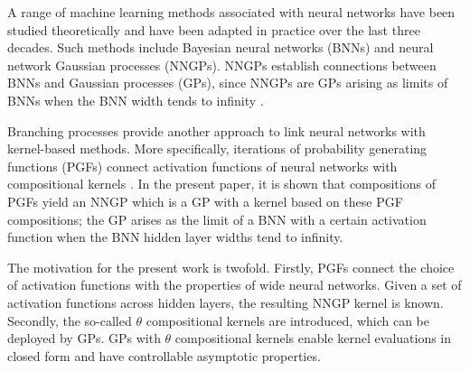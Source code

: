 \documentclass[final, 12pt]{colt2021} %
\begin{document}
A range of machine learning methods
associated with neural networks
have been studied theoretically
and have been adapted in practice
over the last three decades.
Such methods include
Bayesian neural networks (BNNs) and
neural network Gaussian processes (NNGPs).
NNGPs establish connections between
BNNs and Gaussian processes (GPs),
since NNGPs are GPs arising as limits of BNNs
when the BNN width tends to infinity
\citep{neal1996, matthews2018, agrawal2020}.

Branching processes provide another approach
to link neural networks with kernel-based methods.
More specifically,
iterations of probability generating functions (PGFs)
connect activation functions of neural networks
with compositional kernels
\citep{daniely2016, liang2021}.
In the present paper, it is shown that
compositions of PGFs yield an NNGP
which is a GP with a kernel
based on these PGF compositions;
the GP arises as the limit of a BNN
with a certain activation function
when the BNN hidden layer widths tend to infinity.

The motivation for the present work is twofold.
Firstly, PGFs connect
the choice of activation functions with
the properties of wide neural networks.
Given a set of activation functions across hidden layers,
the resulting NNGP kernel is known.
Secondly,
the so-called $\theta$ compositional kernels are introduced,
which can be deployed by GPs.
GPs with $\theta$ compositional kernels
enable kernel evaluations in closed form
and have controllable asymptotic properties.
\end{document}
